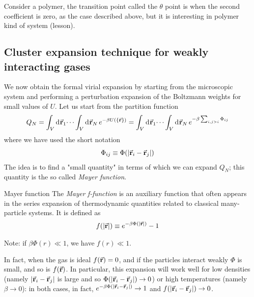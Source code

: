 \documentclass[../../Main/Main.tex]{subfiles}
\begin{document}
\begin{remark}
   Consider a polymer, the transition point called the \( \theta  \) point is when the second coefficient is zero, as the case described above, but it is interesting in polymer kind of system (lesson).
\end{remark}

\subsection{Cluster expansion technique for weakly interacting gases}

We now obtain the formal virial expansion by starting from the microscopic system and performing a perturbation expansion of the Boltzmann weights for small values of \( U \).
Let us start from the partition function
\begin{equation}
  Q_N = \int_{V}^{} \dd[]{\va{r}_1} \dots \int_{V}^{} \dd[]{\va{r}_N}  e^{-\beta U (\{ \va{r} \}  ) } = \int_{V}^{} \dd[]{\va{r}_1} \dots \int_{V}^{} \dd[]{\va{r}_N}  e^{-\beta \sum_{i,j > i}^{} \Phi _{ij} }
\end{equation}
where we have used the short notation
\begin{equation*}
  \Phi _{ij} \equiv \Phi (\abs{\va{r}_i - \va{r}_j} )
\end{equation*}
The idea is to find a "small quantity" in terms of which we can expand \( Q_N \); this quantity is the so called \emph{Mayer function}.
\begin{definition}{Mayer function}{}
  The \emph{Mayer f-function} is an auxiliary function that often appears in the series expansion of thermodynamic quantities related to classical many-particle systems. It is defined as
  \begin{equation}
    f (\abs{\va{r}} ) \equiv e^ { - \beta \Phi ( \abs{\va{r}} )} -1
  \end{equation}
  \begin{remark}
  Note: if \( \beta \Phi (r) \ll 1 \), we have \( f(r) \ll 1 \).
  \end{remark}
\end{definition}
In fact, when the gas is ideal  \( f(\va{r}) = 0 \), and if the particles interact weakly \( \Phi  \) is small, and so is \( f(\va{r})  \).
In particular, this expansion will work well for low densities (namely \( | \va {r}_i - \va{r}_j| \)  is large and so \( \Phi  (|\va {r}_i - \va{r}_j| ) \to 0 \)) or high temperatures (namely \( \beta \to 0  \)): in both cases, in fact, \( e^{-\beta  \Phi  (|\va {r}_i - \va{r}_j| )} \rightarrow 1 \) and \( f  (|\va {r}_i - \va{r}_j| ) \to 0 \).
\end{document}
